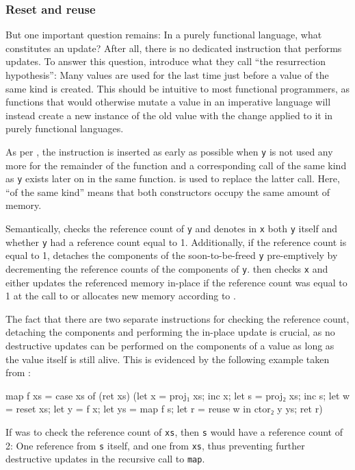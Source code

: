 \subsubsection{Reset and reuse}
But one important question remains: In a purely functional language, what constitutes an update? After all, there is no dedicated instruction that performs updates. To answer this question, \cite{ullrich_counting_2020} introduce what they call ``the resurrection hypothesis'': Many values are used for the last time just before a value of the same kind is created. This should be intuitive to most functional programmers, as functions that would otherwise mutate a value in an imperative language will instead create a new instance of the old value with the change applied to it in purely functional languages.

As per \cite{ullrich_counting_2020}, the  instruction is inserted as early as possible when \texttt{y} is not used any more for the remainder of the function and a corresponding  call of the same kind as \texttt{y} exists later on in the same function.  is used to replace the latter  call. Here, ``of the same kind'' means that both constructors occupy the same amount of memory.

Semantically,  checks the reference count of \texttt{y} and denotes in \texttt{x} both \texttt{y} itself and whether \texttt{y} had a reference count equal to 1. Additionally, if the reference count is equal to 1,  detaches the components of the soon-to-be-freed \texttt{y} pre-emptively by decrementing the reference counts of the components of \texttt{y}.  then checks \texttt{x} and either updates the referenced memory in-place if the reference count was equal to 1 at the call to  or allocates new memory according to .

The fact that there are two separate instructions for checking the reference count, detaching the components and performing the in-place update is crucial, as no destructive updates can be performed on the components of a value as long as the value itself is still alive. This is evidenced by the following example taken from \cite{ullrich_counting_2020}:\\
\begin{ifcode}
map f xs = case xs of
  (ret xs)
  (let x = proj₁ xs;
   inc x;
   let s = proj₂ xs;
   inc s;
   let w = reset xs;
   let y = f x;
   let ys = map f s;
   let r = reuse w in ctor₂ y ys;
   ret r)
\end{ifcode}
If  was to check the reference count of \texttt{xs}, then \texttt{s} would have a reference count of 2: One reference from \texttt{s} itself, and one from \texttt{xs}, thus preventing further destructive updates in the recursive call to \texttt{map}.

